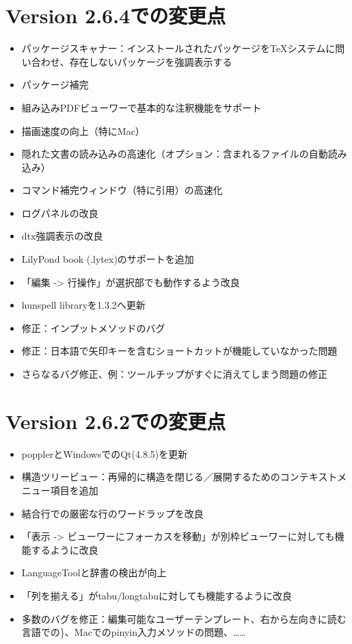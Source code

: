 \section{Version 2.6.4での変更点}

\begin{itemize}
\item
  パッケージスキャナー：インストールされたパッケージをTeXシステムに問い合わせ、存在しないパッケージを強調表示する
\item
  パッケージ補完
\item
  組み込みPDFビューワーで基本的な注釈機能をサポート
\item
  描画速度の向上（特にMac）
\item
  隠れた文書の読み込みの高速化（オプション：含まれるファイルの自動読み込み）
\item
  コマンド補完ウィンドウ（特に引用）の高速化
\item
  ログパネルの改良
\item
  dtx強調表示の改良
\item
  LilyPond book (.lytex)のサポートを追加
\item
  「編集 -\textgreater{} 行操作」が選択部でも動作するよう改良
\item
  hunspell libraryを1.3.2へ更新
\item
  修正：インプットメソッドのバグ
\item
  修正：日本語で矢印キーを含むショートカットが機能していなかった問題
\item
  さらなるバグ修正、例：ツールチップがすぐに消えてしまう問題の修正
\end{itemize}

\section{Version 2.6.2での変更点}

\begin{itemize}
\item
  popplerとWindowsでのQt(4.8.5)を更新
\item
  構造ツリービュー：再帰的に構造を閉じる／展開するためのコンテキストメニュー項目を追加
\item
  結合行での厳密な行のワードラップを改良
\item
  「表示 -\textgreater{}
  ビューワーにフォーカスを移動」が別枠ビューワーに対しても機能するように改良
\item
  LanguageToolと辞書の検出が向上
\item
  「列を揃える」がtabu/longtabuに対しても機能するように改良
\item
  多数のバグを修正：編集可能なユーザーテンプレート、右から左向きに読む言語での\}、Macでのpinyin入力メソッドの問題、……
\end{itemize}

